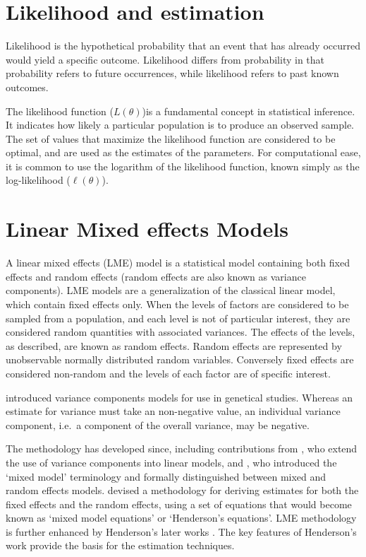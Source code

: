 \documentclass[MAIN.tex]{subfiles}
\begin{document}
\section{Likelihood and estimation}

Likelihood is the hypothetical probability that an event that has already occurred would yield a specific outcome. Likelihood differs from probability in that probability refers to future occurrences, while likelihood refers to past known outcomes.

The likelihood function ($L(\theta)$)is a fundamental concept in statistical inference. It indicates how likely a particular population is to produce an observed sample. The set of values that maximize the likelihood function are considered to be optimal, and are used as the estimates of the parameters. For computational ease, it is common to use the logarithm of the likelihood function, known simply as the log-likelihood ($\ell(\theta)$).


\newpage

\section{Linear Mixed effects Models}
A linear mixed effects (LME) model is a statistical model containing both fixed effects and random effects (random effects are also known as variance components). LME models are a generalization of the classical linear model, which contain fixed effects only. When the levels of factors are considered to be sampled from a population,
and each level is not of particular interest, they are considered random quantities with associated variances.
The effects of the levels, as described, are known as random effects. Random effects are represented by unobservable
normally distributed random variables. Conversely fixed effects are considered non-random and the
levels of each factor are of specific interest.

\citet{Fisher4} introduced variance components models for use in genetical studies. Whereas an estimate for variance must take an non-negative value, an individual variance component, i.e.\ a component of the overall variance, may be negative.

The methodology has developed since, including contributions from
\citet{tippett}, who extend the use of variance components into linear models, and \citet{eisenhart}, who introduced the `mixed model' terminology and formally distinguished between mixed and random effects models. \citet{Henderson:1950} devised a methodology for deriving estimates for both the fixed effects and the random effects, using a set of equations that would become known as `mixed model equations' or `Henderson's equations'.
LME methodology is further enhanced by Henderson's later works \citep{Henderson53, Henderson59,Henderson63,Henderson73,Henderson84a}. The key features of Henderson's work provide the basis for the estimation techniques.
\end{document}
